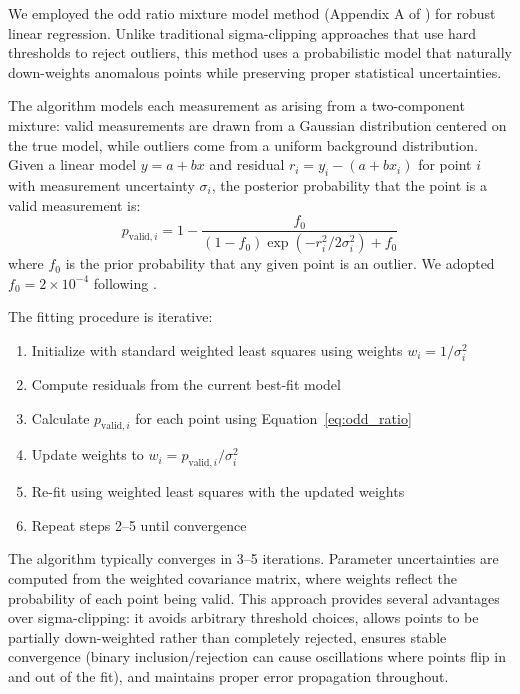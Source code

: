 We employed the odd ratio mixture model method (Appendix A of \citealt{Artigau2022}) for robust
linear regression. Unlike traditional sigma-clipping approaches that use hard
thresholds to reject outliers, this method uses a probabilistic model that
naturally down-weights anomalous points while preserving proper statistical
uncertainties.

The algorithm models each measurement as arising from a two-component mixture:
valid measurements are drawn from a Gaussian distribution centered on the true
model, while outliers come from a uniform background distribution. Given a
linear model $y = a + bx$ and residual $r_i = y_i - (a + bx_i)$ for point $i$
with measurement uncertainty $\sigma_i$, the posterior probability that the
point is a valid measurement is:
\begin{equation}
    p_{\mathrm{valid},i} = 1 - \frac{f_0}{(1-f_0) \exp\left(-r_i^2 / 2\sigma_i^2\right) + f_0}
    \label{eq:odd_ratio}
\end{equation}
where $f_0$ is the prior probability that any given point is an outlier. We
adopted $f_0 = 2 \times 10^{-4}$ following \citet{Artigau2022}.

The fitting procedure is iterative:
\begin{enumerate}
    \item Initialize with standard weighted least squares using weights $w_i = 1/\sigma_i^2$
    \item Compute residuals from the current best-fit model
    \item Calculate $p_{\mathrm{valid},i}$ for each point using Equation~\ref{eq:odd_ratio}
    \item Update weights to $w_i = p_{\mathrm{valid},i} / \sigma_i^2$
    \item Re-fit using weighted least squares with the updated weights
    \item Repeat steps 2--5 until convergence
\end{enumerate}

The algorithm typically converges in 3--5 iterations. Parameter uncertainties
are computed from the weighted covariance matrix, where weights reflect the
probability of each point being valid. This approach provides several
advantages over sigma-clipping: it avoids arbitrary threshold choices, allows
points to be partially down-weighted rather than completely rejected, ensures
stable convergence (binary inclusion/rejection can cause oscillations where
points flip in and out of the fit), and maintains proper error propagation
throughout.


